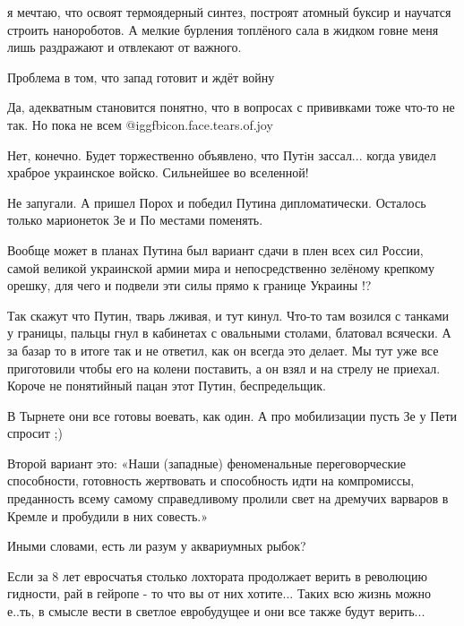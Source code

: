 \begin{multicols}{2}
я мечтаю, что освоят термоядерный синтез, построят атомный буксир и научатся
строить нанороботов. А мелкие бурления топлёного сала в жидком говне меня лишь
раздражают и отвлекают от важного.


Проблема в том, что запад готовит и ждёт войну


Да, адекватным становится понятно, что в вопросах с прививками тоже что-то не
так. Но пока не всем @igg{fbicon.face.tears.of.joy} 


Нет, конечно. Будет торжественно объявлено, что Путiн зассал... когда увидел
храброе украинское войско. Сильнейшее во вселенной!


Не запугали. А пришел Порох и победил Путина дипломатически. Осталось только
марионеток Зе и По местами поменять.


Вообще может в планах Путина был вариант сдачи в плен всех сил России, самой
великой украинской армии мира и непосредственно зелёному крепкому орешку, для
чего и подвели эти силы прямо к границе Украины !?


Так скажут что Путин, тварь  лживая, и тут кинул. Что-то там возился с танками
у границы, пальцы гнул в кабинетах с овальными столами, блатовал всячески. А за
базар то в итоге так и не ответил, как он всегда это делает. Мы тут уже все
приготовили  чтобы его на колени поставить, а он взял и на стрелу не приехал.
Короче не  понятийный пацан этот Путин, беспредельщик.


В Тырнете они все готовы воевать, как один. А про мобилизации пусть Зе у Пети спросит ;)


Второй вариант это: «Наши (западные) феноменальные переговорческие способности,
готовность жертвовать и способность идти на компромиссы, преданность всему
самому справедливому пролили свет на дремучих варваров в Кремле и пробудили в
них совесть.»


Иными словами, есть ли разум у аквариумных рыбок?


Если за 8 лет евросчатья столько лохтората продолжает верить в революцию
гидности, рай в гейропе - то что вы от них хотите... Таких всю жизнь можно
е..ть, в смысле вести в светлое евробудущее и они все также будут верить...


\end{multicols}
